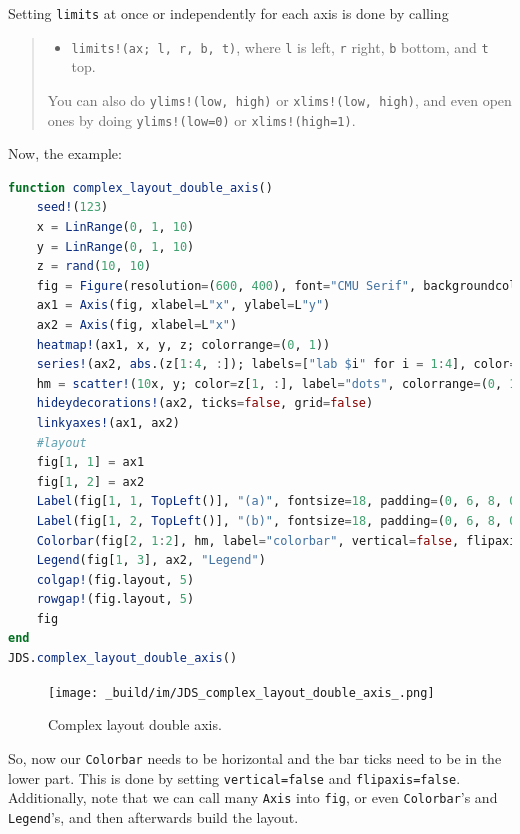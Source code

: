 \documentclass[
  notoc %
]{tufte-book}
\providecommand{\tightlist}{%
  \setlength{\itemsep}{0pt}\setlength{\parskip}{0pt}
}
\newcommand{\passthrough}[1]{#1}
\begin{document}
Setting \passthrough{\lstinline!limits!} at once or independently for
each axis is done by calling

\begin{quote}
\begin{itemize}
\tightlist
\item
  \passthrough{\lstinline"limits!(ax; l, r, b, t)"}, where
  \passthrough{\lstinline!l!} is left, \passthrough{\lstinline!r!}
  right, \passthrough{\lstinline!b!} bottom, and
  \passthrough{\lstinline!t!} top.
\end{itemize}

You can also do \passthrough{\lstinline"ylims!(low, high)"} or
\passthrough{\lstinline"xlims!(low, high)"}, and even open ones by doing
\passthrough{\lstinline"ylims!(low=0)"} or
\passthrough{\lstinline"xlims!(high=1)"}.
\end{quote}

Now, the example:

\begin{lstlisting}[language=Julia]
function complex_layout_double_axis()
    seed!(123)
    x = LinRange(0, 1, 10)
    y = LinRange(0, 1, 10)
    z = rand(10, 10)
    fig = Figure(resolution=(600, 400), font="CMU Serif", backgroundcolor=:grey90)
    ax1 = Axis(fig, xlabel=L"x", ylabel=L"y")
    ax2 = Axis(fig, xlabel=L"x")
    heatmap!(ax1, x, y, z; colorrange=(0, 1))
    series!(ax2, abs.(z[1:4, :]); labels=["lab $i" for i = 1:4], color=:Set1_4)
    hm = scatter!(10x, y; color=z[1, :], label="dots", colorrange=(0, 1))
    hideydecorations!(ax2, ticks=false, grid=false)
    linkyaxes!(ax1, ax2)
    #layout
    fig[1, 1] = ax1
    fig[1, 2] = ax2
    Label(fig[1, 1, TopLeft()], "(a)", fontsize=18, padding=(0, 6, 8, 0))
    Label(fig[1, 2, TopLeft()], "(b)", fontsize=18, padding=(0, 6, 8, 0))
    Colorbar(fig[2, 1:2], hm, label="colorbar", vertical=false, flipaxis=false)
    Legend(fig[1, 3], ax2, "Legend")
    colgap!(fig.layout, 5)
    rowgap!(fig.layout, 5)
    fig
end
JDS.complex_layout_double_axis()
\end{lstlisting}

\begin{figure}
\hypertarget{fig:complex_layout_double_axis}{%
\centering
\texttt{[image: \_build/im/JDS\_complex\_layout\_double\_axis\_.png]}
\caption{Complex layout double
axis.}\label{fig:complex_layout_double_axis}
}
\end{figure}

So, now our \passthrough{\lstinline!Colorbar!} needs to be horizontal
and the bar ticks need to be in the lower part. This is done by setting
\passthrough{\lstinline!vertical=false!} and
\passthrough{\lstinline!flipaxis=false!}. Additionally, note that we can
call many \passthrough{\lstinline!Axis!} into
\passthrough{\lstinline!fig!}, or even
\passthrough{\lstinline!Colorbar!}'s and
\passthrough{\lstinline!Legend!}'s, and then afterwards build the
layout.
\end{document}

